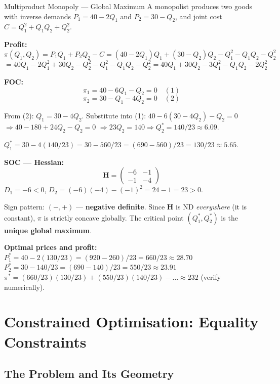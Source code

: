 \documentclass[12pt, a4paper]{article}
\theoremstyle{definition}
\newcommand{\bH}{\mathbf{H}}
\begin{document}
\begin{exbox}{Multiproduct Monopoly --- Global Maximum}
A monopolist produces two goods with inverse demands
$P_1 = 40 - 2Q_1$ and $P_2 = 30 - Q_2$,
and joint cost $C = Q_1^2 + Q_1 Q_2 + Q_2^2$.

\textbf{Profit:}
\[
  \pi(Q_1, Q_2)
  = P_1 Q_1 + P_2 Q_2 - C
  = (40-2Q_1)Q_1 + (30-Q_2)Q_2 - Q_1^2 - Q_1 Q_2 - Q_2^2
\]
\[
  = 40Q_1 - 2Q_1^2 + 30Q_2 - Q_2^2 - Q_1^2 - Q_1 Q_2 - Q_2^2
  = 40Q_1 + 30Q_2 - 3Q_1^2 - Q_1 Q_2 - 2Q_2^2
\]

\textbf{FOC:}
\[
  \pi_1 = 40 - 6Q_1 - Q_2 = 0 \quad (1)
\]
\[
  \pi_2 = 30 - Q_1 - 4Q_2 = 0 \quad (2)
\]

From (2): $Q_1 = 30 - 4Q_2$. Substitute into (1):
$40 - 6(30-4Q_2) - Q_2 = 0$
$\Rightarrow 40 - 180 + 24Q_2 - Q_2 = 0$
$\Rightarrow 23Q_2 = 140 \Rightarrow Q_2^* = 140/23 \approx 6.09$.

$Q_1^* = 30 - 4(140/23) = 30 - 560/23 = (690-560)/23 = 130/23 \approx 5.65$.

\textbf{SOC --- Hessian:}
\[
  \bH = \begin{pmatrix} -6 & -1 \\ -1 & -4 \end{pmatrix}
\]
$D_1 = -6 < 0$, \quad $D_2 = (-6)(-4) - (-1)^2 = 24-1 = 23 > 0$.

Sign pattern: $(-, +)$ --- \textbf{negative definite}. Since $\bH$ is ND
\emph{everywhere} (it is constant), $\pi$ is strictly concave globally.
The critical point $(Q_1^*, Q_2^*)$ is the \textbf{unique global maximum}. \checkmark

\textbf{Optimal prices and profit:}
$P_1^* = 40-2(130/23) = (920-260)/23 = 660/23 \approx 28.70$
$P_2^* = 30-140/23 = (690-140)/23 = 550/23 \approx 23.91$
$\pi^* = (660/23)(130/23) + (550/23)(140/23) - \ldots \approx 232$ (verify numerically).
\end{exbox}

\section{Constrained Optimisation: Equality Constraints}

\subsection{The Problem and Its Geometry}
\end{document}
